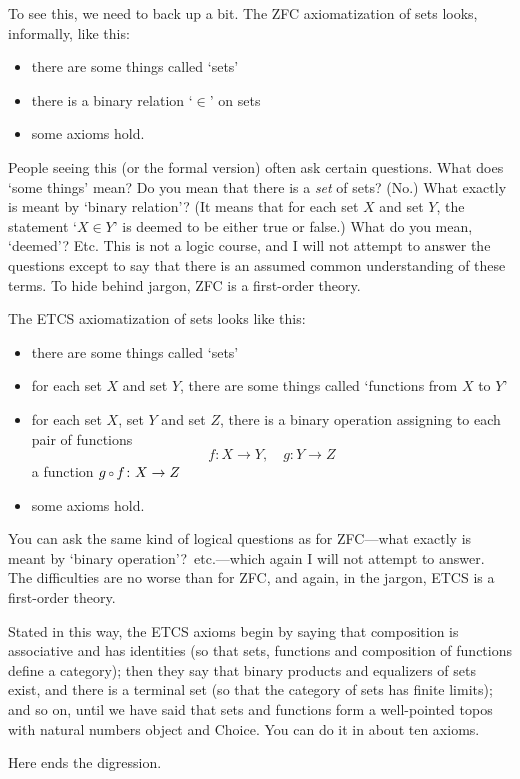 \documentclass{article}
\newcommand{\of}{\,\raisebox{0.08ex}{\ensuremath{\scriptstyle\circ}}\,}
\newcommand{\cln}{\colon}
\begin{document}
To see this, we need to back up a bit.  The ZFC axiomatization of sets looks,
informally, like this:
% 
\begin{itemize}
\item there are some things called `sets'
\item there is a binary relation `$\in$' on sets
\item some axioms hold.
\end{itemize}
% 
People seeing this (or the formal version) often ask certain questions.  What
does `some things' mean?  Do you mean that there is a \emph{set} of sets?
(No.)  What exactly is meant by `binary relation'?  (It means that for each
set $X$ and set $Y$, the statement `$X \in Y$' is deemed to be either true or
false.)  What do you mean, `deemed'?  Etc.  This is not a logic course, and I
will not attempt to answer the questions except to say that there is an
assumed common understanding of these terms.  To hide behind jargon, ZFC is a
first-order theory.

The ETCS axiomatization of sets looks like this:
% 
\begin{itemize}
\item there are some things called `sets'
\item for each set $X$ and set $Y$, there are some things called `functions
from $X$ to $Y$'
\item for each set $X$, set $Y$ and set $Z$, there is a binary operation
assigning to each pair of functions
\[
f\cln X \to Y, 
\quad
g\cln Y \to Z
\]
a function $g \of f\cln X \to Z$
\item some axioms hold.
\end{itemize}
% 
You can ask the same kind of logical questions as for ZFC---what exactly is
meant by `binary operation'?\ etc.---which again I will not attempt to
answer.  The difficulties are no worse than for ZFC, and again, in the jargon,
ETCS is a first-order theory.  

Stated in this way, the ETCS axioms begin by saying that composition is
associative and has identities (so that sets, functions and composition of
functions define a category); then they say that binary products and
equalizers of sets exist, and there is a terminal set (so that the category of
sets has finite limits); and so on, until we have said that sets and functions
form a well-pointed topos with natural numbers object and Choice.  You can do
it in about ten axioms.

Here ends the digression.

\bigskip
\end{document}
